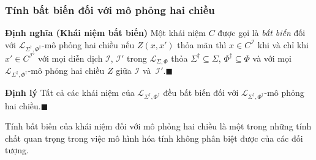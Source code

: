 \documentclass[notheorems,xcolor=dvipsnames]{beamer}
\newcommand{\mL}		{\mathcal{L}}
\newcommand{\mI}		{\mathcal{I}}
\newcommand{\mO}		{\mathcal{O}}
\newcommand{\SigmaDag}	{\Sigma^\dag}
\newcommand{\SigmaDagI}	{\Sigma^\dag_I}
\newcommand{\PhiDag}	{\Phi^\dag}
\newcommand{\mLSP}		{\mL_{\Sigma,\Phi}}
\newcommand{\mLSPD}		{\mL_{\Sigma^\dag,\Phi^\dag}}
\newcommand{\myend}		{\mbox{}\hfill\mbox{{\tiny$\!\blacksquare$}}}
\newcommand{\E}			{\exists}
\begin{document}

\begin{frame}\frametitle{\bf Tính bất biến đối với mô phỏng hai chiều}
	\begin{block}{\bf Định nghĩa (Khái niệm bất biến)}
		Một khái niệm $C$ được gọi là {\em bất biến} đối với $\mLSPD$-mô phỏng hai chiều nếu $Z(x, x')$ thỏa mãn thì $x \in C^\mI$ khi và chỉ khi $x' \in C^{\mI'}$ với mọi diễn dịch $\mI$, $\mI'$ trong $\mLSP$ thỏa $\SigmaDag \subseteq \Sigma$, $\PhiDag \subseteq \Phi$ và với mọi $\mLSPD$-mô phỏng hai chiều $Z$ giữa $\mI$ và~$\mI'$.\myend
	\end{block}
	
	\begin{block}{\bf Định lý}
	\label{th:Invariant}
		Tất cả các khái niệm của $\mLSPD$ đều bất biến đối với $\mLSPD$-mô phỏng hai chiều.\myend
	\end{block}
	\vspace{1.5ex}
	
	Tính bất biến của khái niệm đối với mô phỏng hai chiều là một trong những tính chất quan trọng trong việc mô hình hóa tính không phân biệt được của các đối tượng.	
\end{frame}
\end{document}
